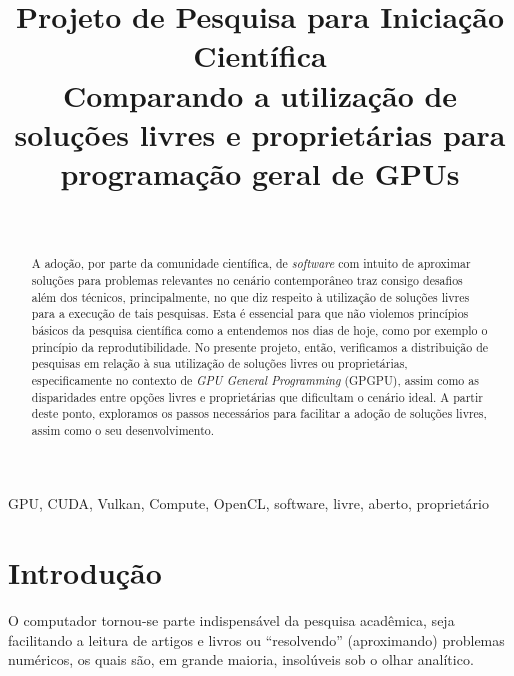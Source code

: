 \documentclass[10pt, a4paper, draftcls, conference, onecolumn]{IEEEtran}
\begin{document}
\title{\textbf{Projeto de Pesquisa para Iniciação Científica} \\
{Comparando a utilização de soluções livres e proprietárias para programação geral de GPUs}
}

\author{ \\
\and
{}
}

\maketitle

\begin{abstract}
    A adoção, por parte da comunidade científica, de \textit{software} com
    intuito de aproximar soluções para problemas relevantes no cenário
    contemporâneo traz consigo desafios além dos técnicos, principalmente, no
    que diz respeito à utilização de soluções livres para a execução de tais
    pesquisas. Esta é essencial para que não violemos princípios básicos da
    pesquisa científica como a entendemos nos dias de hoje, como por exemplo
    o princípio da reprodutibilidade. No presente projeto, então, verificamos a
    distribuição de pesquisas em relação à sua utilização de soluções livres ou
    proprietárias, especificamente no contexto de \textit{GPU General
    Programming} (GPGPU), assim como as disparidades entre opções livres e
    proprietárias que dificultam o cenário ideal. A partir deste ponto,
    exploramos os passos necessários para facilitar a adoção de soluções
    livres, assim como o seu desenvolvimento.
\end{abstract}

\begin{IEEEkeywords}
    GPU, CUDA, Vulkan, Compute, OpenCL, software, livre, aberto, proprietário
\end{IEEEkeywords}

\section{Introdução}

O computador tornou-se parte indispensável da pesquisa acadêmica, seja
facilitando a leitura de artigos e livros ou ``resolvendo'' (aproximando)
problemas numéricos, os quais são, em grande maioria, insolúveis sob o olhar
analítico.
\end{document}
